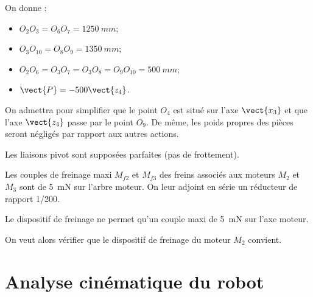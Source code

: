 On donne : 
\begin{itemize}
\item $O_2O_3 = O_6O_7 = \SI{1250}{mm}$; 
\item $O_3O_{10} = O_8O_9 = \SI{1350}{mm}$; 
\item $O_2O_6 = O_3O_7 = O_3O_8 = O_9O_{10} = \SI{500}{mm}$; 
\item $\vect{P} = -500\vect{z_4}$. 
\end{itemize}

On admettra pour simplifier que le point $O_4$ est situé sur l’axe $\vect{x_3}$ et que l’axe $\vect{z_4}$ passe par le point $O_9$. De même, les poids propres des pièces seront négligés par rapport aux autres 
actions. 

Les liaisons pivot sont supposées parfaites (pas de frottement). 

Les couples de freinage maxi $M_{f2}$ et $M_{f3}$ des freins associés aux moteurs $M_2$ et $M_3$ sont de 
\SI{5}{mN} sur l’arbre moteur. On leur adjoint en série un réducteur de rapport 1/200.



Le dispositif de freinage ne permet qu’un couple maxi de \SI{5}{mN} sur l’axe 
moteur. 




On veut alors vérifier que le dispositif de freinage du moteur $M_2$ convient. 




\section{Analyse cinématique du robot}

